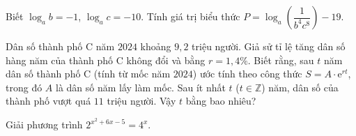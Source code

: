 \begin{ex}%
	 			Biết $\log_a b = -1$, $\log_a c = -10$. Tính giá trị biểu thức $P = \log_a \left( \dfrac{1}{b^4 c^8} \right) - 19$.
	 	\end{ex}

\begin{ex}%
	Dân số thành phố C năm $2024$ khoảng $9{,}2$ triệu người. Giả sử tỉ lệ tăng dân số hàng năm của thành phố C không đổi và bằng $r=1{,}4\%$. Biết rằng, sau $t$ năm dân số thành phố C (tính từ mốc năm $2024$) ước tính theo công thức $S=A\cdot \mathrm{e}^{rt}$, trong đó $A$ là dân số năm lấy làm mốc. Sau ít nhất $t$ ($t\in \mathbb{Z}$) năm, dân số của thành phố vượt quá $11$ triệu người. Vậy $t$ bằng bao nhiêu?
\end{ex}

\begin{ex}%
	Giải phương trình $2^{x^2+6x-5}=4^x$.
\end{ex}

